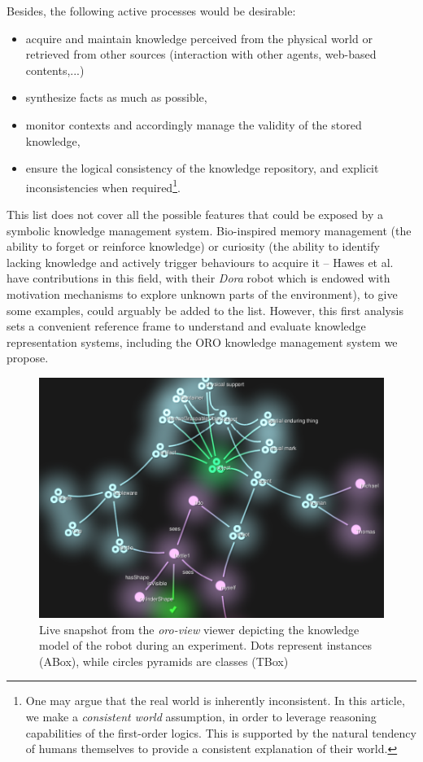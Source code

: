 \documentclass[twocolumn]{svjour3}
\begin{document}
Besides, the following active processes would be desirable:
\begin{itemize}
	\item acquire and maintain knowledge perceived from the physical world or
	retrieved from other sources (interaction with other agents, web-based contents,...)
	\item synthesize facts as much as possible,
	\item monitor contexts and accordingly manage the validity of the stored knowledge,
	\item ensure the logical consistency of the knowledge repository, and
	explicit inconsistencies when required\footnote{One may argue that the real world is 
	inherently inconsistent. In this article, we make a
	\textit{consistent world} assumption, in order to leverage reasoning
	capabilities of the first-order logics. This is supported by the natural
	tendency of humans themselves to provide a consistent explanation of their
	world.}.
\end{itemize}

This list does not cover all the possible features that could be exposed by a
symbolic knowledge management system. Bio-inspired memory management (the
ability to forget or reinforce knowledge) or curiosity (the ability to identify
lacking knowledge and actively trigger behaviours to acquire it -- Hawes et
al.~\cite{Hawes2011} have contributions in this field, with their \emph{Dora}
robot which is endowed with motivation mechanisms to explore unknown parts of
the environment), to give some examples, could arguably be added to the list.
However, this first analysis sets a convenient reference frame to understand
and evaluate knowledge representation systems, including the \textsc{ORO}
knowledge management system we propose.

\begin{figure}[!ht]
\centering
  \includegraphics[width=\columnwidth]{images/snapshot_oroview.png}
  \caption{Live snapshot from the \emph{oro-view} viewer depicting the
  knowledge model of the robot during an experiment. Dots represent
  instances (ABox), while circles pyramids are classes (TBox)}
  \label{fig|oro-view}
\end{figure}
\end{document}
